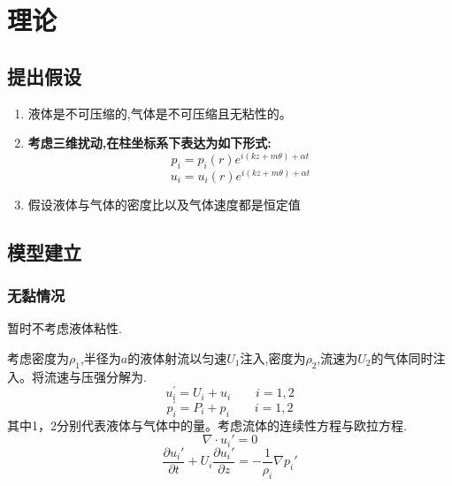 \documentclass[UTF8]{gapd}
\begin{document}
\section{理论}
\label{sec:Theory}
\subsection{提出假设}

\begin{enumerate}
	\item 液体是不可压缩的,气体是不可压缩且无粘性的。
	\item \textbf{考虑三维扰动,在柱坐标系下表达为如下形式:}
	\begin{equation}
p_{i}=p_{i}(r) e^{i(k z+m \theta)+\alpha t} 
	\end{equation}
	\begin{equation}
	u_{i}=u_{i}(r) e^{i(k z+m \theta)+\alpha t}
	\end{equation}
	\item 假设液体与气体的密度比以及气体速度都是恒定值
\end{enumerate}

\subsection{模型建立}
\subsubsection{无黏情况}
暂时不考虑液体粘性.

考虑密度为$\rho_{1}$,半径为$a$的液体射流以匀速$U_{1}$注入,密度为$\rho_{2}$,流速为$U_{2}$的气体同时注入。将流速与压强分解为.
\begin{equation}
u_{i}^{\prime}=U_{i}+u_{i}\quad\quad i=1,2 
\end{equation}
\begin{equation}
p_{i}^{\prime}=P_{i}+p_{i}\quad\quad i=1,2
\end{equation}	
其中1，2分别代表液体与气体中的量。考虑流体的连续性方程与欧拉方程.
\begin{equation}
\nabla \cdot u_i'=0
\end{equation}
\begin{equation}
\frac{\partial u_i'}{\partial t}+U_i\frac{\partial u_i'}{\partial z}=-\frac{1}{\rho _i}\nabla p_i'
\end{equation}
\end{document}
